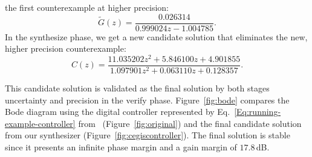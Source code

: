 \documentclass[final]{sig-alternate-05-2015}
\newcommand{\blue}[1]{{\color{blue}#1}}
\begin{document}
the first counterexample at higher precision:
%
$$ 
\tilde G(z) = \frac{0.026314}{0.999024z{-}1.004785}. 
$$
In the {\sc synthesize} phase, we get a new candidate solution that
eliminates the new, higher precision counterexample:
%
$$ 
C(z)=\frac{11.035202z^2{+}5.846100z{+}4.901855}{1.097901z^2{+}0.063110z{+}0.128357}. 
$$
%

This candidate solution is validated  as the final solution by both stages
{\sc uncertainty} and {\sc precision} in the {\sc verify} phase. 
Figure~\ref{fig:bode} compares the Bode diagram using the digital controller 
represented by Eq.~\eqref{Eq:running-example-controller}
from~\cite{DBLP:conf/hybrid/WangGRJF16} (Figure~\ref{fig:original}) and the
final candidate solution from our synthesizer
(Figure~\ref{fig:cegiscontroller}).  The \tool final solution is stable
since it presents an infinite phase margin and a gain margin of $17.8$\,dB.




\end{document}
